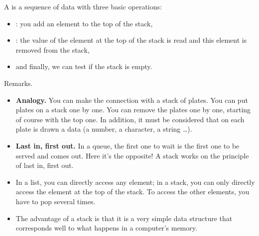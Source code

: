 \documentclass[11pt,class=report,crop=false]{standalone}
\begin{document}



\begin{cours}[Stack]

  A  is a sequence of data with three basic operations:
  \begin{itemize}
    \item {}: you add an element to the top of the stack,
    \item {}: the value of the element at the top of the stack is read and this element is removed from the stack,
    \item and finally, we can test if the stack is empty.
  \end{itemize}  



Remarks.
\begin{itemize}
  \item \textbf{Analogy.} You can make the connection with a stack of plates. You can put plates on a stack one by one. You can remove the plates one by one, starting of course with the top one. In addition, it must be considered that on each plate is drawn a data (a number, a character, a string \ldots).

  \item \textbf{Last in, first out.} 
  In a queue, the first one to wait is the first one to be served and comes out. Here it's the opposite! A stack works on the principle of \og{}last in, first out\fg{}.
  
  \item In a list, you can directly access any element; in a stack, you can only directly access the element at the top of the stack. To access the other elements, you have to pop several times.
  
  \item The advantage of a stack is that it is a very simple data structure that corresponds well to what happens in a computer's memory.
\end{itemize}
\end{cours}
\end{document}
